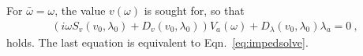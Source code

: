 \documentclass[12pt]{amsproc}
\begin{document}
For $\bar\omega = \omega$, the value $v(\omega)$ is sought for, so that 
\begin{align}
    \left(
        i\omega S_v(v_0,\lambda_0)+ D_v(v_0,\lambda_0)
    \right)V_a(\omega)+
    D_\lambda(v_0,\lambda_0)\lambda_a=0~,
\end{align}
holds. The last equation is equivalent to Eqn.~\eqref{eq:impedsolve}.
\end{document}

